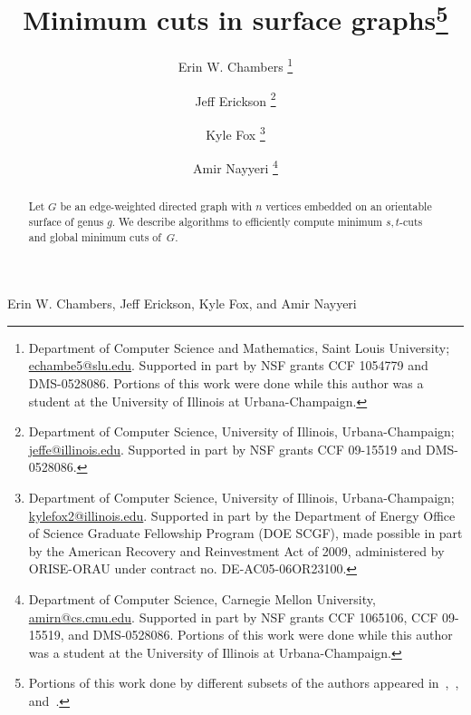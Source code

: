 \documentclass[11pt,twoside]{article}
\begin{document}
\pagestyle{myheadings}
		 {Erin W. Chambers, Jeff Erickson, Kyle Fox, and Amir Nayyeri}

\begin{titlepage}

\title{Minimum cuts in surface graphs\footnote{
Portions of this work done by different subsets of the authors appeared in~\cite{cen-mcshc-09},~\cite{en-mcsnc-11}, and~\cite{efn-gmcse-12}.
}}

\author{
  Erin W. Chambers%
  \thanks{Department of Computer Science and Mathematics, Saint Louis
  University;
  \url{echambe5@slu.edu}.  Supported in part by NSF grants CCF 1054779 and DMS-0528086.
  Portions of this work were done while this author was a student at the University of Illinois at Urbana-Champaign.}
  \and
  Jeff Erickson%
  \thanks{Department of Computer Science,
  University of Illinois, Urbana-Champaign; \url{jeffe@illinois.edu}.
  Supported in part by NSF grants CCF 09-15519 and DMS-0528086.
  }
  \and
  Kyle Fox%
  \thanks{Department of Computer Science,
      University of Illinois, Urbana-Champaign;
      \url{kylefox2@illinois.edu}.
      Supported in part by
      the Department of Energy Office
      of Science Graduate Fellowship Program (DOE SCGF),
      made possible in part by the American Recovery and
      Reinvestment Act of 2009, administered by ORISE-ORAU
      under contract no. DE-AC05-06OR23100.}
  \and
  Amir Nayyeri%
  \thanks{Department of Computer Science,
      Carnegie Mellon University,
      \url{amirn@cs.cmu.edu}. Supported in part by NSF grants
      CCF 1065106, CCF 09-15519, and DMS-0528086. Portions of this work were done while this author was a student 
      at the University of Illinois at Urbana-Champaign.}
      }

\DRAFT

\maketitle
\begin{abstract}
Let $G$ be an edge-weighted directed graph with $n$ vertices embedded on an orientable surface of genus $g$.
We describe algorithms to efficiently compute minimum $s,t$-cuts and global minimum cuts of~$G$.
\end{abstract}

\noindent

\thispagestyle{empty}
\setcounter{page}{0}
\end{titlepage}















\end{document}
